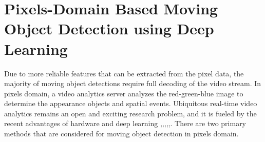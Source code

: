 \section{Pixels-Domain Based Moving Object Detection using Deep Learning}
Due to more reliable features that can be extracted from the pixel data, the majority of moving object detections require full decoding of the video stream. In pixels domain, a video analytics server analyzes the red-green-blue image to determine the appearance objects and spatial events. Ubiquitous real-time video analytics remains an open and exciting research problem, and it is fueled by the recent advantages of hardware and deep learning \cite{zeng2018background},\cite{chen2017pixel},\cite{babaee2018deep},\cite{wang2017interactive},\cite{patil2018msfgnet},\cite{ou2019moving}. There are two primary methods that are considered for moving object detection in pixels domain.
